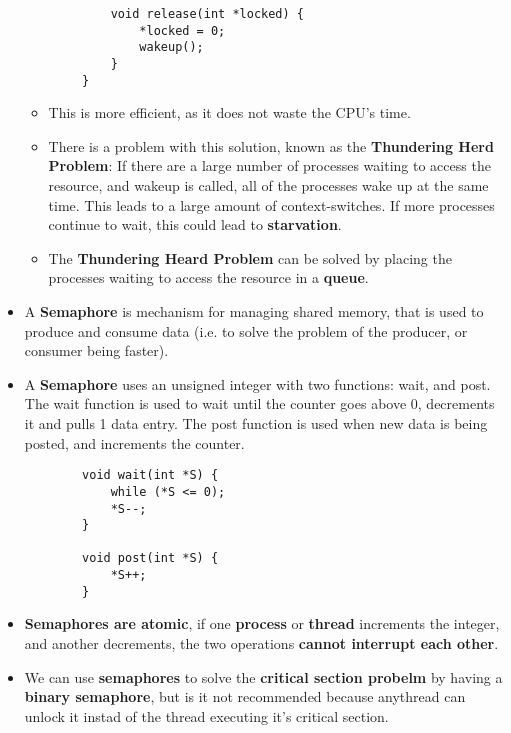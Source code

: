 \documentclass{article}
\begin{document}
\begin{itemize}
\begin{verbatim}
            void release(int *locked) {
                *locked = 0;
                wakeup();
            }
        }
    \end{verbatim}
    \begin{itemize}
        \item This is more efficient, as it does not waste the CPU's time.
        \item There is a problem with this solution, known as the \textbf{Thundering Herd Problem}: If there are a large number of processes waiting to access the resource, and wakeup is called, all of the processes wake up at the same time. This leads to a large amount of context-switches. If more processes continue to wait, this could lead to \textbf{starvation}.
        \item The \textbf{Thundering Heard Problem} can be solved by placing the processes waiting to access the resource in a \textbf{queue}.
    \end{itemize}
    \item A \textbf{Semaphore} is mechanism for managing shared memory, that is used to produce and consume data (i.e. to solve the problem of the producer, or consumer being faster).
    \item A \textbf{Semaphore} uses an unsigned integer with two functions: wait, and post. The wait function is used to wait until the counter goes above 0, decrements it and pulls 1 data entry. The post function is used when new data is being posted, and increments the counter.
    \begin{verbatim}
        void wait(int *S) {
            while (*S <= 0);
            *S--;
        }

        void post(int *S) {
            *S++;
        }
    \end{verbatim}
    \item \textbf{Semaphores are atomic}, if one \textbf{process} or \textbf{thread} increments the integer, and another decrements, the two operations \textbf{cannot interrupt each other}.
    \item We can use \textbf{semaphores} to solve the \textbf{critical section probelm} by having a \textbf{binary semaphore}, but is it not recommended because anythread can unlock it instad of the thread executing it's critical section.
\end{itemize}
\end{document}
